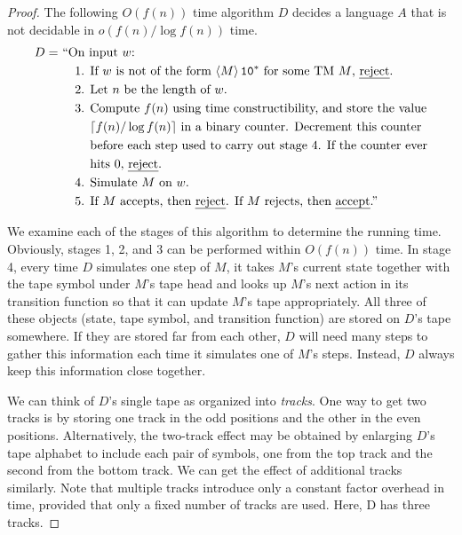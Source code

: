 \documentclass[11pt,twoside=off,numbers=noenddot]{scrbook}
\begin{document}
\begin{proof}
  The following $O(f(n))$ time algorithm $D$ decides a language $A$ that is not decidable in $o(f(n) / \log f(n))$ time.
  \begin{align*}
    D = & \ \text{``On input $w$:} \\
    & \ \quad \text{1. } \text{If $w$ is not of the form $\enc{M}\texttt{1}\texttt{0}^\ast$ for some TM $M$, \emph{reject}.} \\
    & \ \quad \text{2. } \text{Let $n$ be the length of $w$.} \\
    & \ \quad \text{3. } \text{Compute $f(n)$ using time constructibility, and store the value} \\
    & \ \quad \phantom{\text{3. }} \text{$\ceil{f(n) / \log f(n)}$ in a binary counter. Decrement this counter} \\
    & \ \quad \phantom{\text{3. }} \text{before each step used to carry out stage 4. If the counter ever} \\
    & \ \quad \phantom{\text{3. }} \text{hits 0, \emph{reject}.} \\
    & \ \quad \text{4. } \text{Simulate $M$ on $w$.} \\
    & \ \quad \text{5. } \text{If $M$ accepts, then \emph{reject}. If $M$ rejects, then \emph{accept}.''}
  \end{align*}

  We examine each of the stages of this algorithm to determine the running time. Obviously, stages 1, 2, and 3 can be performed within $O(f(n))$ time. In stage 4, every time $D$ simulates one step of $M$, it takes $M$'s current state together with the tape symbol under $M$'s tape head and looks up $M$'s next action in its transition function so that it can update $M$'s tape appropriately. All three of these objects (state, tape symbol, and transition function) are stored on $D$'s tape somewhere. If they are stored far from each other, $D$ will need many steps to gather this information each time it simulates one of $M$'s steps. Instead, $D$ always keep this information close together.

  We can think of $D$'s single tape as organized into \emph{tracks}. One way to get two tracks is by storing one track in the odd positions and the other in the even positions. Alternatively, the two-track effect may be obtained by enlarging $D$'s tape alphabet to include each pair of symbols, one from the top track and the second from the bottom track. We can get the effect of additional tracks similarly. Note that multiple tracks introduce only a constant factor overhead in time, provided that only a fixed number of tracks are used. Here, D has three tracks.


\end{proof}
\end{document}
